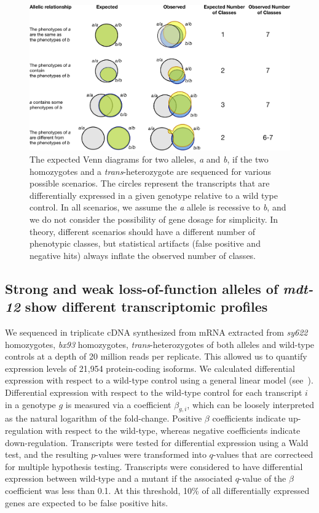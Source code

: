 \documentclass[10pt, twocolumn]{article}
\newcommand{\gene}[1]{\mbox{\emph{#1}}}
\begin{document}
\begin{figure}
  \centering{}
  \includegraphics[width=.9\textwidth]{../figs/AllelicAnalysis_With_Het}
  \caption{
  The expected Venn diagrams for two alleles, \emph{a} and
  \emph{b}, if the two homozygotes and a \emph{trans}-heterozygote are
  sequenced for various possible scenarios. The circles represent the transcripts
  that are differentially expressed in a given genotype relative to a wild type
  control. In all scenarios, we assume the
  \emph{a} allele is recessive to \emph{b}, and we do not consider the
  possibility of gene dosage for simplicity. In theory, different scenarios
  should have a different number of phenotypic classes, but statistical artifacts
  (false positive and negative hits) always inflate the observed number of
  classes.
  }
\label{fig:framework}
\end{figure}


\subsection*{Strong and weak loss-of-function alleles of \gene{mdt-12} show
             different transcriptomic profiles}
We sequenced in triplicate cDNA synthesized from mRNA extracted from
\emph{sy622} homozygotes, \emph{bx93} homozygotes,
\emph{trans}-heterozygotes of both alleles and wild-type controls at a depth of
20 million reads per replicate. This allowed us to quantify expression levels of
21,954 protein-coding isoforms. We calculated differential expression with
respect to a wild-type control using a general linear model
(see~). Differential expression with respect to the
wild-type control for each transcript $i$ in a genotype $g$ is measured via a
coefficient $\beta_{g, i}$, which can be loosely interpreted as the natural
logarithm of the fold-change. Positive $\beta$ coefficients indicate
up-regulation with respect to the wild-type, whereas negative coefficients
indicate down-regulation. Transcripts were tested for differential expression
using a Wald test, and the resulting $p$-values were transformed into $q$-values
that are correcteed for multiple hypothesis testing. Transcripts were considered
to have differential expression between wild-type and a mutant if the associated
$q$-value of the $\beta$ coefficient was less than 0.1. At this threshold, 10\%
of all differentially expressed genes are expected to be false positive hits.
\end{document}

